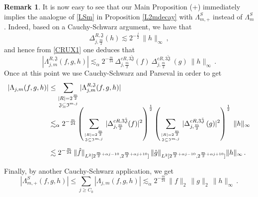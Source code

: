 \documentclass[a4paper,reqno]{amsart}
\numberwithin{equation}{section}
\theoremstyle{definition}
\newtheorem{remark}[theorem]{Remark}
\def\beq{\begin{equation}}
\def\eeq{\end{equation}}
\def\beq{\begin{equation}}
\def\eeq{\end{equation}}
\def\a{\alpha}
\def\beq{\begin{equation}}
\def\eeq{\end{equation}}
\def\beq{\begin{equation}}
\def\eeq{\end{equation}}
\def\L{\Lambda}
\begin{document}
\begin{remark}\label{l2l2intol1} It is now easy to see that our Main Proposition (+) immediately implies the analogue of \eqref{LSm} in Proposition \ref{L2mdecay} with $\L^{S}_{m,+}$ instead of $\L^S_{m}$. Indeed, based on a Cauchy-Schwarz argument, we have that
\beq\label{hsup}
\Delta_{j,\frac{m}{2}}^{R,\mathfrak{J}} (h)\lesssim 2^{-\frac{j}{2}}\, \|h\|_{\infty}\:,
\eeq
and hence from \eqref{CRUX1} one deduces that
\beq\label{CRUX10}
|\L_{j,m}^{R,\mathfrak{J}}(f,g,h)|\lesssim_{\a}  2^{-\frac{m}{24}}\,\Delta_{j,\frac{m}{2}}^{c R, 3\tilde{\mathfrak{J}}}\!(f)\: \Delta_{j,\frac{m}{2}}^{c R,3\tilde{\mathfrak{J}}}\:\!(g)\:\|h\|_{\infty}\,.
\eeq
Once at this point we use Cauchy-Schwarz and Parseval in order to get
\begin{align*}
	|\L_{j,m}(f,g,h)|&\leq \sum_{\substack{|R|=2^{\frac{m}{2}}\\[.1ex]\mathfrak{J}\subseteq \mathfrak{I}^{m,j}}}|\L_{j,m}^{R,\mathfrak{J}}(f,g,h)|\\[-2ex]
	&\lesssim_{\a}  2^{-\frac{m}{24}}
	\left( \sum_{{|R|=2^{\frac{m}{2}}}\atop{\mathfrak{J}\subseteq \mathfrak{I}^{m,j}}}|\Delta_{j,\frac{m}{2}}^{c R, 3\tilde{\mathfrak{J}}}(f)|^2\right)^{\frac{1}{2}} \left(\sum_{{|R|=2^{\frac{m}{2}}}\atop{\mathfrak{J}\subseteq \mathfrak{I}^{m,j}}}|\Delta_{j,\frac{m}{2}}^{c R,3\tilde{\mathfrak{J}}}\:(g)|^2\right)^{\frac{1}{2}}\:\|h\|_{\infty}\\[1ex]
	&\lesssim 2^{-\frac{m}{24}}\,\|\hat{f}\|_{L^2[2^{\frac{m}{2}+\a j-10}, 2^{\frac{m}{2}+\a j+10}]}\,\|\hat{g}\|_{L^2[2^{\frac{m}{2}+\a j-10}, 2^{\frac{m}{2}+\a j+10}]}\|h\|_{\infty}\,.
\end{align*}

Finally, by another Cauchy-Schwarz application, we get
\begin{equation}\label{Lcs}
	|\L^{S}_{m,+}(f,g,h)|\leq \sum_{j\ge  C_0}|\L_{j,m}(f,g,h)|\lesssim_{\a} 2^{-\frac{m}{24}}\,\|f\|_2\,\|g\|_2\,\|h\|_{\infty}\,.
\end{equation}
\end{remark}

\end{document}
